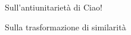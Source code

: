 \backupbegin
\begin{frame}{Sull'antiunitarietà di \hT}
    Ciao!
\end{frame}

\begin{frame}{Sulla trasformazione di similarità}

\end{frame}

\backupend
